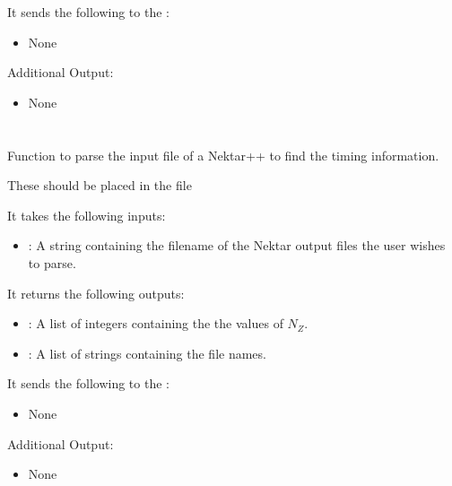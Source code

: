 It sends the following to the :

\begin{itemize}
\item None
\end{itemize}

Additional Output:
\begin{itemize}
\item None
\end{itemize}


\section{}
Function to parse the input file of a Nektar++  to find the timing information.

These should be placed in the file 

It takes the following inputs:

\begin{itemize}
\item {}: A string containing the filename of the Nektar output files the user wishes to parse.
\end{itemize}

It returns the following outputs:

\begin{itemize}
\item {}: A list of integers containing the the values of \(N_Z\).
\item {}: A list of strings containing the file names.
\end{itemize}

It sends the following to the :

\begin{itemize}
\item None
\end{itemize}

Additional Output:
\begin{itemize}
\item None
\end{itemize}
\section{}

